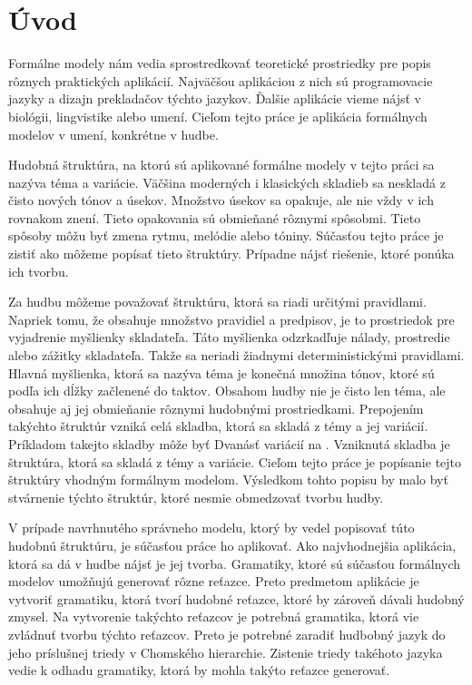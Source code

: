 \newtheorem{definition}{Definícia}[section]
\newtheorem{example}{Príklad}[section]

\def\UrlBreaks{\do\/\do-}

\chapter{Úvod}
Formálne modely nám vedia sprostredkovať teoretické prostriedky pre popis rôznych praktických aplikácií. Najväčšou aplikáciou z nich sú programovacie jazyky a dizajn prekladačov týchto jazykov. Ďalšie aplikácie vieme nájsť v biológii, lingvistike alebo umení. Cieľom tejto práce je aplikácia formálnych modelov v umení, konkrétne v hudbe.

Hudobná štruktúra, na ktorú sú aplikované formálne modely v tejto práci sa nazýva téma a variácie. Väčšina moderných i klasických skladieb sa neskladá z čisto nových tónov a úsekov. Množstvo úsekov sa opakuje, ale nie vždy v ich rovnakom znení. Tieto opakovania sú obmieňané rôznymi spôsobmi. Tieto spôsoby môžu byť zmena rytmu, melódie alebo tóniny. Súčasťou tejto práce je zistiť ako môžeme popísať tieto štruktúry. Prípadne nájsť riešenie, ktoré ponúka ich tvorbu.

Za hudbu môžeme považovať štruktúru, ktorá sa riadi určitými pravidlami. Napriek tomu, že obsahuje množstvo pravidiel a predpisov, je to prostriedok pre vyjadrenie myšlienky skladateľa. Táto myšlienka odzrkadľuje nálady, prostredie alebo zážitky skladateľa. Takže sa neriadi žiadnymi deterministickými pravidlami. Hlavná myšlienka, ktorá sa nazýva téma je konečná množina tónov, ktoré sú podľa ich dĺžky začlenené do taktov. Obsahom hudby nie je čisto len téma, ale obsahuje aj jej obmieňanie rôznymi hudobnými prostriedkami. Prepojením takýchto štruktúr vzniká celá skladba, ktorá sa skladá z témy a jej variácií. Príkladom takejto skladby môže byť Dvanásť variácií na . Vzniknutá skladba je štruktúra, ktorá sa skladá z témy a variácie. Cieľom tejto práce je popísanie tejto štruktúry vhodným formálnym modelom. Výsledkom tohto popisu by malo byť stvárnenie týchto štruktúr, ktoré nesmie obmedzovať tvorbu hudby.

V prípade navrhnutého správneho modelu, ktorý by vedel popisovať túto hudobnú štruktúru, je súčasťou práce ho aplikovať. Ako najvhodnejšia aplikácia, ktorá sa dá v hudbe nájsť je jej tvorba. Gramatiky, ktoré sú súčasťou formálnych modelov umožňujú generovať rôzne reťazce. Preto predmetom aplikácie je vytvoriť gramatiku, ktorá tvorí hudobné reťazce, ktoré by zároveň dávali hudobný zmysel. Na vytvorenie takýchto reťazcov je potrebná gramatika, ktorá vie zvládnuť tvorbu týchto reťazcov. Preto je potrebné zaradiť hudbobný jazyk do jeho príslušnej triedy v Chomského hierarchie. Zistenie triedy takéhoto jazyka vedie k odhadu gramatiky, ktorá by mohla takýto reťazce generovať. 

